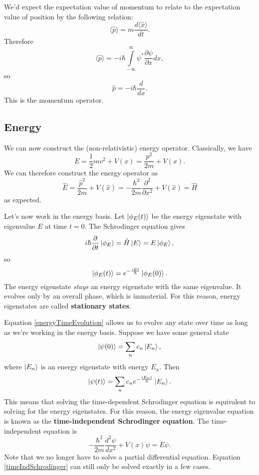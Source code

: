 We'd expect the expectation value of momentum to relate to the expectation value of position by the following relation:
\begin{equation}
\langle \hat{p} \rangle = m \frac{d\langle \hat{x} \rangle}{dt}.
\end{equation}
Therefore 
\begin{equation*}
\langle \hat{p} \rangle =  -i\hbar \int\limits_{-\infty}^{\infty} \psi^*\frac{\partial \psi}{\partial x}dx,
\end{equation*}
so 
\begin{equation}
\hat{p} = -i\hbar \frac{d}{dx}.
\end{equation}
This is the momentum operator. 
\subsection{Energy}
We can now construct the (non-relativistic) energy operator. Classically, we have
$$E =  \frac{1}{2} mv^2 + V(x) = \frac{p^2}{2m} + V(x).$$ We can therefore construct the energy operator as 
$$\hat{E} =  \frac{\hat{p}^2}{2m} + V(\hat{x}) = -\frac{\hbar^2}{2m} \frac{\partial^2 }{\partial x^2} + V(\hat{x}) = \hat{H} $$ as expected. 

Let's now work in the energy basis. Let $\left| \phi_E (t) \right\rangle$ be the energy eigenstate with eigenvalue $E$ at time $t=0$. The Schrodinger equation gives 
\[i\hbar\frac{\partial}{\partial t} \left| \phi_E \right\rangle = \hat{H} \left| E \right\rangle = E \left| \phi_E \right\rangle,\]
so 
\begin{equation}
\left| \phi_E (t) \right\rangle = e^{-\frac{iEt}{\hbar}} \left| \phi_E(0) \right\rangle.
\label{energyTimeEvolution}
\end{equation}
The energy eigenstate \textit{stays} an energy eigenstate with the same eigenvalue. It evolves only by an overall phase, which is immaterial. For this reason, energy eigenstates are called \textbf{stationary states}.

Equation \ref{energyTimeEvolution} allows us to evolve any state over time as long as we're working in the energy basis. Suppose we have some general state $$\left| \psi(0) \right\rangle = \sum_{n} c_n \left| E_n \right\rangle,$$ where $\left| E_n \right\rangle$ is an energy eigenstate with energy $E_n$. Then
\begin{equation}
\left| \psi(t) \right\rangle = \sum_{n} c_n e^{-\frac{iE_nt}{\hbar}} \left| E_n \right\rangle.
\end{equation}
This means that solving the time-dependent Schrodinger equation is equivalent to solving for the energy eigenstates. For this reason, the energy eigenvalue equation is known as the \textbf{time-independent Schrodinger equation}. The time-independent equation is
\begin{equation}
-\frac{\hbar^2}{2m} \frac{d^2 \psi}{d x^2} + V(x) \psi = E \psi.
\label{timeIndSchrodinger}
\end{equation}
Note that we no longer have to solve a partial differential equation. Equation \ref{timeIndSchrodinger} can still only be solved exactly in a few cases.
